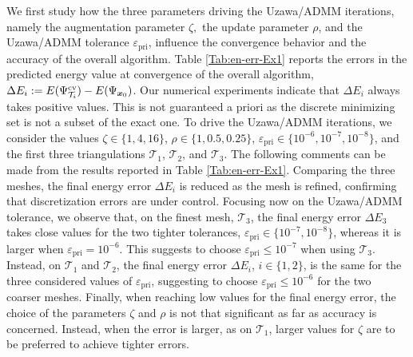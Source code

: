 \documentclass[a4paper,11pt]{article}
\theoremstyle{definition}
\theoremstyle{remark}
\numberwithin{equation}{section}
\newcommand{\bx}{{\boldsymbol x}}
\begin{document}
We first study how the three parameters driving the Uzawa/ADMM iterations, namely the augmentation parameter $\zeta,$ the update parameter $\rho$, and the Uzawa/ADMM tolerance $\varepsilon_{\text{pri}}$, influence the convergence behavior and the accuracy of the overall algorithm.
Table \ref{Tab:en-err-Ex1} reports the errors in the predicted energy value at convergence of the overall algorithm, $\Delta E_{i} := E(\Psi^{\rm cv}_{\mathcal{T}_i}) - E(\Psi_{\bx_0})$. Our numerical experiments indicate that $\Delta E_i$ always takes positive values. This is not guaranteed a priori as the discrete minimizing set is not a subset of the exact one. To drive the Uzawa/ADMM iterations, we consider the values 
$\zeta\in\{1,4,16\}$, $\rho\in\{1,0.5,0.25\}$, $\varepsilon_{\text{pri}} \in \{10^{-6},10^{-7},10^{-8}\}$, and the first three triangulations $\mathcal{T}_1$, $\mathcal{T}_2$, and $\mathcal{T}_3$.
The following comments can be made from the results reported in Table \ref{Tab:en-err-Ex1}. Comparing the three meshes, the final energy error $\Delta E_i$ is reduced as the mesh is refined, confirming that discretization errors are under control. Focusing now on the Uzawa/ADMM tolerance, we observe that, on the finest mesh, $\mathcal{T}_3$, the final energy error $\Delta E_3$ takes close values for the two tighter tolerances, $\varepsilon_{\text{pri}} \in \{10^{-7},10^{-8}\}$, whereas it is larger when $\varepsilon_{\text{pri}}=10^{-6}$. This suggests to choose $\varepsilon_{\text{pri}} \le 10^{-7}$ when using $\mathcal{T}_3$. Instead, on $\mathcal{T}_1$ and $\mathcal{T}_2$, the final energy error $\Delta E_i$, $i\in\{1,2\}$, is the same for the three considered values of $\varepsilon_{\text{pri}}$, suggesting to choose $\varepsilon_{\text{pri}} \le 10^{-6}$ for the two coarser meshes. Finally, when reaching low values for the final energy error, the choice of the parameters $\zeta$ and $\rho$ is not that significant as far as accuracy is concerned. Instead, when the error is larger, as on $\mathcal{T}_1$, larger values for $\zeta$ are to be preferred to achieve tighter errors.   
\end{document}
